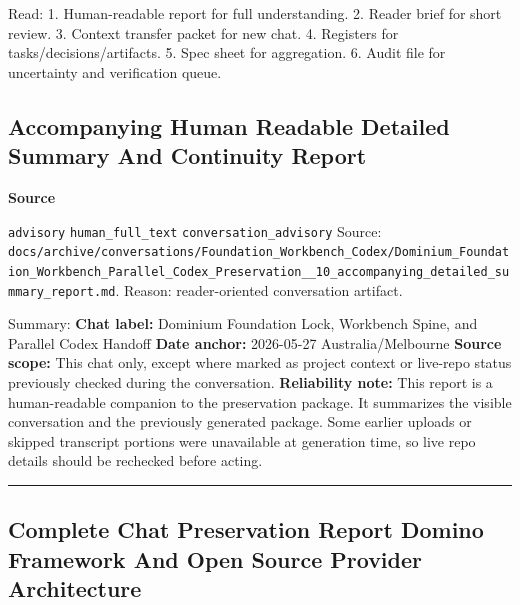 \documentclass[9pt,a4paper,openany]{book}
\newcommand{\vonecallout}[3]{\par\medskip\noindent\begingroup\setlength{\fboxsep}{7pt}\colorbox{DomCalloutBg}{\parbox{0.94\linewidth}{\textbf{\textcolor{#1}{#2}}\par #3}}\endgroup\par\medskip}
\begin{document}
Read: 1.\allowbreak{} Human-\allowbreak{}readable report for full understanding.\allowbreak{} 2.\allowbreak{} Reader brief for short review.\allowbreak{} 3.\allowbreak{} Context transfer packet for new chat.\allowbreak{} 4.\allowbreak{} Registers for tasks/\allowbreak{}decisions/\allowbreak{}artifacts.\allowbreak{} 5.\allowbreak{} Spec sheet for aggregation.\allowbreak{} 6.\allowbreak{} Audit file for uncertainty and verification queue.\allowbreak{}



\subsection{Accompanying Human Readable Detailed Summary And Continuity Report}

\vonecallout{DomSlate}{Source}{\texttt{advisory} \texttt{human\_\allowbreak{}full\_\allowbreak{}text} \texttt{conversation\_\allowbreak{}advisory} Source: \texttt{docs/\allowbreak{}archive/\allowbreak{}conversations/\allowbreak{}Foundation\_\allowbreak{}Workbench\_\allowbreak{}Codex/\allowbreak{}Dominium\_\allowbreak{}Foundation\_\allowbreak{}Workbench\_\allowbreak{}Parallel\_\allowbreak{}Codex\_\allowbreak{}Preservation\_\allowbreak{}\_\allowbreak{}10\_\allowbreak{}accompanying\_\allowbreak{}detailed\_\allowbreak{}summary\_\allowbreak{}report.\allowbreak{}md}.\allowbreak{} Reason: reader-\allowbreak{}oriented conversation artifact.\allowbreak{}}

Summary: \textbf{Chat label:} Dominium Foundation Lock, Workbench Spine, and Parallel Codex Handoff \textbf{Date anchor:} 2026-\allowbreak{}05-\allowbreak{}27 Australia/\allowbreak{}Melbourne \textbf{Source scope:} This chat only, except where marked as project context or live-\allowbreak{}repo status previously checked during the conversation.\allowbreak{} \textbf{Reliability note:} This report is a human-\allowbreak{}readable companion to the preservation package.\allowbreak{} It summarizes the visible conversation and the previously generated package.\allowbreak{} Some earlier uploads or skipped transcript portions were unavailable at generation time, so live repo details should be rechecked before acting.\allowbreak{}


\par\medskip\hrule\medskip


\subsection{Complete Chat Preservation Report Domino Framework And Open Source Provider Architecture}
\end{document}
